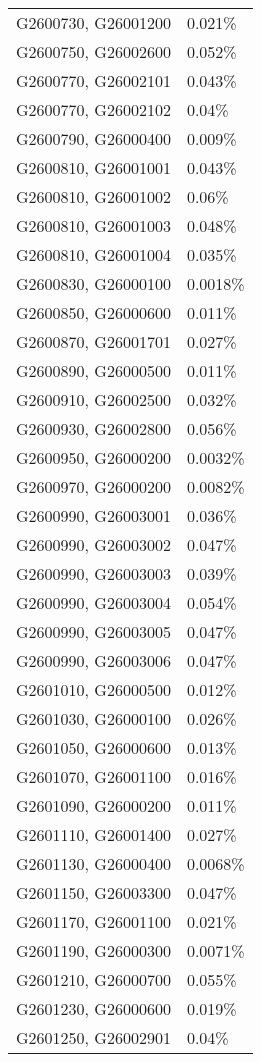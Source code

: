\begin{longtable}[]{@{}ll@{}}
G2600730, G26001200 & 0.021\% \\
G2600750, G26002600 & 0.052\% \\
G2600770, G26002101 & 0.043\% \\
G2600770, G26002102 & 0.04\% \\
G2600790, G26000400 & 0.009\% \\
G2600810, G26001001 & 0.043\% \\
G2600810, G26001002 & 0.06\% \\
G2600810, G26001003 & 0.048\% \\
G2600810, G26001004 & 0.035\% \\
G2600830, G26000100 & 0.0018\% \\
G2600850, G26000600 & 0.011\% \\
G2600870, G26001701 & 0.027\% \\
G2600890, G26000500 & 0.011\% \\
G2600910, G26002500 & 0.032\% \\
G2600930, G26002800 & 0.056\% \\
G2600950, G26000200 & 0.0032\% \\
G2600970, G26000200 & 0.0082\% \\
G2600990, G26003001 & 0.036\% \\
G2600990, G26003002 & 0.047\% \\
G2600990, G26003003 & 0.039\% \\
G2600990, G26003004 & 0.054\% \\
G2600990, G26003005 & 0.047\% \\
G2600990, G26003006 & 0.047\% \\
G2601010, G26000500 & 0.012\% \\
G2601030, G26000100 & 0.026\% \\
G2601050, G26000600 & 0.013\% \\
G2601070, G26001100 & 0.016\% \\
G2601090, G26000200 & 0.011\% \\
G2601110, G26001400 & 0.027\% \\
G2601130, G26000400 & 0.0068\% \\
G2601150, G26003300 & 0.047\% \\
G2601170, G26001100 & 0.021\% \\
G2601190, G26000300 & 0.0071\% \\
G2601210, G26000700 & 0.055\% \\
G2601230, G26000600 & 0.019\% \\
G2601250, G26002901 & 0.04\% \\

\end{longtable}
